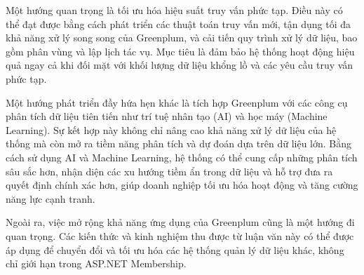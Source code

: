 Một hướng quan trọng là tối ưu hóa hiệu suất truy vấn phức tạp. Điều này có thể đạt được bằng cách phát triển các thuật toán truy vấn mới, tận dụng tối đa khả năng xử lý song song của Greenplum, và cải tiến quy trình xử lý dữ liệu, bao gồm phân vùng và lập lịch tác vụ. Mục tiêu là đảm bảo hệ thống hoạt động hiệu quả ngay cả khi đối mặt với khối lượng dữ liệu khổng lồ và các yêu cầu truy vấn phức tạp.

Một hướng phát triển đầy hứa hẹn khác là tích hợp Greenplum với các công cụ phân tích dữ liệu tiên tiến như trí tuệ nhân tạo (AI) và học máy (Machine Learning). Sự kết hợp này không chỉ nâng cao khả năng xử lý dữ liệu của hệ thống mà còn mở ra tiềm năng phân tích và dự đoán dựa trên dữ liệu lớn. Bằng cách sử dụng AI và Machine Learning, hệ thống có thể cung cấp những phân tích sâu sắc hơn, nhận diện các xu hướng tiềm ẩn trong dữ liệu và hỗ trợ đưa ra quyết định chính xác hơn, giúp doanh nghiệp tối ưu hóa hoạt động và tăng cường năng lực cạnh tranh.

Ngoài ra, việc mở rộng khả năng ứng dụng của Greenplum cũng là một hướng đi quan trọng. Các kiến thức và kinh nghiệm thu được từ luận văn này có thể được áp dụng để chuyển đổi và tối ưu hóa các hệ thống quản lý dữ liệu khác, không chỉ giới hạn trong ASP.NET Membership.

